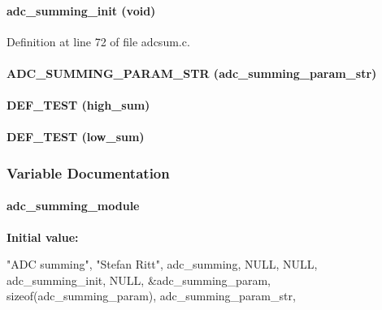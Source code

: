 \paragraph[{adc\_\-summing\_\-init}]{ adc\_\-summing\_\-init (void)}\hfill\label{adcsum_8c_a51c765a64de2c9724513173b04621120}


Definition at line 72 of file adcsum.c.
\paragraph[{ADC\_\-SUMMING\_\-PARAM\_\-STR}]{\setlength{\rightskip}{0pt plus 5cm}ADC\_\-SUMMING\_\-PARAM\_\-STR (adc\_\-summing\_\-param\_\-str)}\hfill\label{adcsum_8c_ac1ce062d6d59b5b4b49b3f31a7d47ed9}
\paragraph[{DEF\_\-TEST}]{\setlength{\rightskip}{0pt plus 5cm}DEF\_\-TEST (high\_\-sum)}\hfill\label{adcsum_8c_a620477cc033ef6e43877cfda019f7fe6}
\paragraph[{DEF\_\-TEST}]{\setlength{\rightskip}{0pt plus 5cm}DEF\_\-TEST (low\_\-sum)}\hfill\label{adcsum_8c_a2a258b626ab744fc5ce8c6534c524cf5}


\subsubsection{Variable Documentation}
\paragraph[{adc\_\-summing\_\-module}]{ {\bf adc\_\-summing\_\-module}}\hfill\label{adcsum_8c_a5304a76f0819218c694defe1e049c584}
{\bfseries Initial value:}
\begin{DoxyCode}
 {
   "ADC summing",               
   "Stefan Ritt",               
   adc_summing,                 
   NULL,                        
   NULL,                        
   adc_summing_init,            
   NULL,                        
   &adc_summing_param,          
   sizeof(adc_summing_param),   
   adc_summing_param_str,       
}
\end{DoxyCode}


